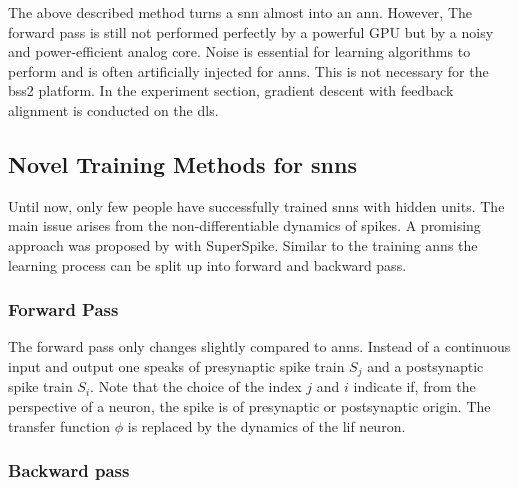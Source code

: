 The above described method turns a \gls{snn} almost into an \gls{ann}. However, The forward pass is still not performed perfectly by a powerful GPU but by a noisy and power-efficient analog core. Noise is essential for learning algorithms to perform and is often artificially injected for \glspl{ann}. This is not necessary for the \gls{bss2} platform. In the experiment section, gradient descent with feedback alignment is conducted on the \gls{dls}.


\subsection{Novel Training Methods for \glspl{snn}}


Until now, only few people have successfully trained \glspl{snn} with hidden units. The main issue arises from the non-differentiable dynamics of spikes. A promising approach was proposed by \cite{zenke2018superspike} with SuperSpike. Similar to the training \glspl{ann} the learning process can be split up into forward and backward pass. 

\subsubsection*{Forward Pass}
The forward pass only changes slightly compared to \glspl{ann}. Instead of a continuous input and output one speaks of presynaptic spike train $S_j$ and a postsynaptic spike train $S_i$. Note that the choice of the index $j$ and $i$ indicate if, from the perspective of a neuron, the spike is of presynaptic or postsynaptic origin. The transfer function $\phi$ is replaced by the dynamics of the \gls{lif} neuron.


\subsubsection*{Backward pass}


